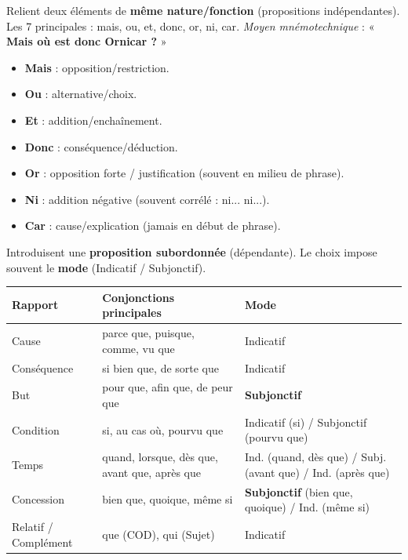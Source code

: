 \documentclass[11pt]{article}
\newcommand{\cle}[1]{{\popxbold\color{popdark}#1}}
\begin{document}
\begin{propriete}
Relient deux éléments de \textbf{même nature/fonction} (propositions indépendantes). Les 7 principales : \cle{mais}, \cle{ou}, \cle{et}, \cle{donc}, \cle{or}, \cle{ni}, \cle{car}.
\emph{Moyen mnémotechnique} : « \textbf{Mais où est donc Ornicar ?} »
\begin{itemize}
\item \textbf{Mais} : opposition/restriction.
\item \textbf{Ou} : alternative/choix.
\item \textbf{Et} : addition/enchaînement.
\item \textbf{Donc} : conséquence/déduction.
\item \textbf{Or} : opposition forte / justification (souvent en milieu de phrase).
\item \textbf{Ni} : addition négative (souvent corrélé : ni... ni...).
\item \textbf{Car} : cause/explication (jamais en début de phrase).
\end{itemize}
\end{propriete}

\begin{propriete}
Introduisent une \textbf{proposition subordonnée} (dépendante). Le choix impose souvent le \textbf{mode} (Indicatif / Subjonctif).
\begin{center}
\begin{tabularx}{\linewidth}{|l|X|l|}\hline
\textbf{Rapport} & \textbf{Conjonctions principales} & \textbf{Mode} \\ \hline
Cause & \cle{parce que}, \cle{puisque}, \cle{comme}, \cle{vu que} & Indicatif \\ \hline
Conséquence & \cle{si bien que}, \cle{de sorte que} & Indicatif \\ \hline
But & \cle{pour que}, \cle{afin que}, \cle{de peur que} & \textbf{Subjonctif} \\ \hline
Condition & \cle{si}, \cle{au cas où}, \cle{pourvu que} & Indicatif (si) / Subjonctif (pourvu que) \\ \hline
Temps & \cle{quand}, \cle{lorsque}, \cle{dès que}, \cle{avant que}, \cle{après que} & Ind. (quand, dès que) / Subj. (avant que) / Ind. (après que) \\ \hline
Concession & \cle{bien que}, \cle{quoique}, \cle{même si} & \textbf{Subjonctif} (bien que, quoique) / Ind. (même si) \\ \hline
Relatif / Complément & \cle{que} (COD), \cle{qui} (Sujet) & Indicatif \\ \hline
\end{tabularx}
\end{center}
\end{propriete}
\end{document}
